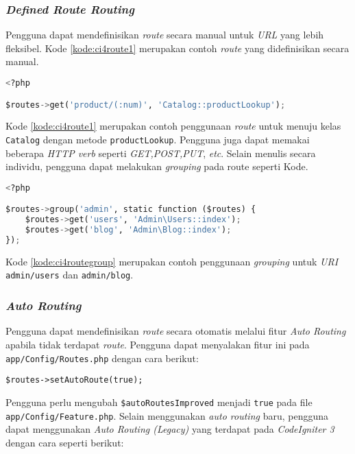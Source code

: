 \subsubsection{\textit{Defined Route Routing}}
Pengguna dapat mendefinisikan \textit{route} secara manual untuk \textit{URL} yang lebih fleksibel. Kode \ref{kode:ci4route1} merupakan contoh \textit{route} yang didefinisikan secara manual.
\begin{lstlisting}[language=Python,caption=Contoh \textit{route} yang didefinisikan secara manual,label=kode:ci4route1]
<?php

$routes->get('product/(:num)', 'Catalog::productLookup');
\end{lstlisting}
Kode \ref{kode:ci4route1} merupakan contoh penggunaan \textit{route} untuk menuju kelas \texttt{Catalog} dengan metode \texttt{productLookup}. Pengguna juga dapat memakai beberapa \textit{HTTP verb} seperti \textit{GET,POST,PUT}, \textit{etc}. Selain menulis secara individu, pengguna dapat melakukan \textit{grouping} pada route seperti Kode.
\begin{lstlisting}[language=Python,caption=Contoh \textit{route} yang menggunakan \textit{grouping} manual,label=kode:ci4routegroup]
<?php

$routes->group('admin', static function ($routes) {
    $routes->get('users', 'Admin\Users::index');
    $routes->get('blog', 'Admin\Blog::index');
});
\end{lstlisting}

Kode \ref{kode:ci4routegroup} merupakan contoh penggunaan \textit{grouping} untuk \textit{URI} \texttt{admin/users} dan \texttt{admin/blog}.

\subsubsection{\textit{Auto Routing}\label{subsubsec:autorouting}} 
Pengguna dapat mendefinisikan \textit{route} secara otomatis melalui fitur \textit{Auto Routing} apabila tidak terdapat \textit{route}. Pengguna dapat menyalakan  fitur ini pada \texttt{app/Config/Routes.php} dengan cara berikut:
\begin{center}
\verb|$routes->setAutoRoute(true);|
\end{center}
Pengguna perlu mengubah \verb|$autoRoutesImproved| menjadi \verb|true| pada file \verb|app/Config/Feature.php|. Selain menggunakan \textit{auto routing} baru, pengguna dapat menggunakan \textit{Auto Routing (Legacy)} yang terdapat pada \textit{CodeIgniter 3} dengan cara seperti berikut:


